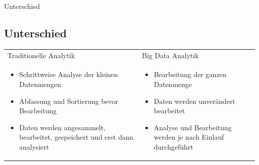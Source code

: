\documentclass[11pt]{beamer}
\begin{document}
\begin{frame}{Unterschied}
\subsection{Unterschied}
\setlength\tabcolsep{0pt}
\setlength\thickmuskip{0mu}
\setlength\medmuskip{0mu}
\small
\centering
\begin{tabular*}{\textwidth}{ p{145pt} p{145pt}} 
Traditionelle Analytik & Big Data Analytik \\ 
\begin{itemize}
\item Schrittweise Analyse der kleinen Datenmengen
\item Abfassung und Sortierung bevor Bearbeitung
\item Daten werden angesammelt, bearbeitet, gespeichert und erst dann analysiert 
\end{itemize}
&
\begin{itemize}
\item Bearbeitung der ganzen Datenmenge 
\item Daten werden unverändert bearbeitet
\item Analyse und Bearbeitung werden je nach Einlauf durchgeführt 
\end{itemize}

\end{tabular*} 
	\begin{figure}
	\end{figure}
\end{frame}
\end{document}
